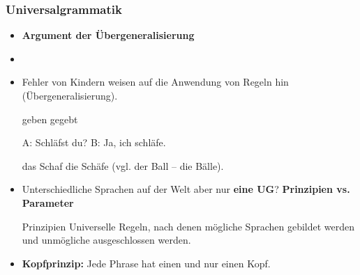 \begin{frame}
\frametitle{Universalgrammatik}

\begin{itemize}
	\item \textbf{Argument der Übergeneralisierung}
	\item[]
	\item Fehler von Kindern weisen auf die Anwendung von Regeln hin (Übergeneralisierung).

\pause	
	\eal 
	\ex geben
	\ex gegebt
	\zl
	
	\eal 
	\ex A: Schläfst du?
	\ex B: Ja, ich schläfe.
	\zl
	
	\eal 
	\ex das Schaf
	\ex die Schäfe (vgl. der Ball -- die Bälle).
	\zl

\end{itemize}

\end{frame}


\begin{frame}

\begin{itemize}
	\item Unterschiedliche Sprachen auf der Welt aber nur \textbf{eine UG}? \ras \textbf{Prinzipien vs. Parameter}

	\begin{block}{Prinzipien}
	Universelle Regeln, nach denen mögliche Sprachen gebildet werden und unmögliche ausgeschlossen werden. 
	\end{block}
	
	\item \textbf{Kopfprinzip:} Jede Phrase hat einen und nur einen Kopf.

\pause
	\eal 
	\zl
	
\end{itemize}

\end{frame}


